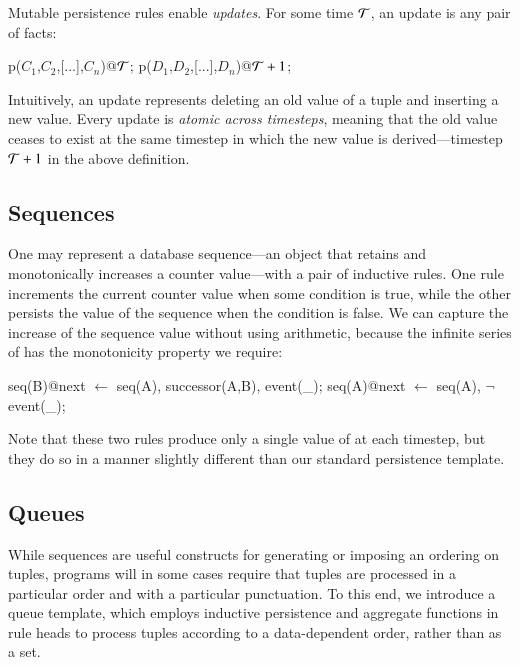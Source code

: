 Mutable persistence rules enable {\em updates}.  For some time $\Tau$, an
update is any pair of facts:

\begin{Dedalus}
p\nega(\(C_1\),\(C_2\),[...],\(C_n\))@\(\Tau\);
p\pos(\(D_1\),\(D_2\),[...],\(D_n\))@\(\Tau+1\);
\end{Dedalus}
\noindent
Intuitively, an update represents deleting an old value of a tuple and
inserting a new value.  Every update is {\em atomic across timesteps}, meaning
that the old value ceases to exist at the same timestep in which the new value
is derived---timestep $\Tau+1$ in the above definition.


\subsection{Sequences}
One may represent a database sequence---an object that retains and monotonically increases a counter value---with a pair of inductive rules.  One rule increments the current counter value when some condition is 
true, while the other persists the value of the sequence when the condition is false.  We can capture the increase
of the sequence value without using arithmetic, because the infinite series of  has the monotonicity
property we require:

\begin{Dedalus}
seq(B)@next \(\leftarrow\) seq(A), successor(A,B), event(_);  
seq(A)@next \(\leftarrow\) seq(A), \(\lnot\)event(_);
\end{Dedalus}

\noindent
Note that these two rules produce only a single value of  at each timestep, but they do so in a manner slightly different than our standard persistence template.

\subsection{Queues}

While sequences are useful constructs for generating or imposing an ordering on tuples, programs will in some cases require that tuples
are processed in a particular order and with a particular punctuation.   To this end, we introduce a queue template, which employs 
inductive persistence and aggregate functions in rule heads to process tuples according to a data-dependent order, rather than as a set.

